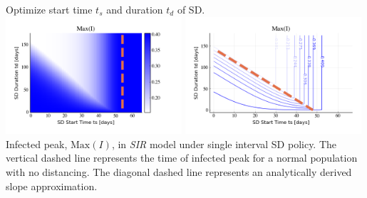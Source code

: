 \documentclass[10pt]{beamer}
\begin{document}
\begin{frame}{Optimize start time $t_s$ and duration $t_d$ of SD.}
	\includegraphics[width=0.49\textwidth]{epidemic-sir-heatmap.png}
	\includegraphics[width=0.49\textwidth]{epidemic-sir-contour.png} \\ \vspace{0.5cm}
	Infected peak, $\mbox{Max}(I)$, in \textit{SIR} model under single interval SD policy. The vertical dashed line represents the time of infected peak for a normal population with no distancing. The diagonal dashed line represents an analytically derived slope approximation.
\end{frame}
\end{document}
